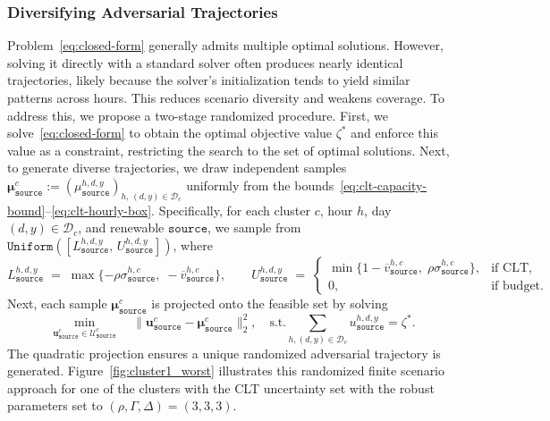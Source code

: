 \documentclass[11pt, letter]{article}
\begin{document}
\subsubsection{Diversifying Adversarial Trajectories}
Problem~\eqref{eq:closed-form} generally admits multiple optimal solutions. However, solving it directly with a standard solver often produces nearly identical trajectories, likely because the solver’s initialization tends to yield similar patterns across hours. This reduces scenario diversity and weakens coverage. To address this, we propose a two-stage randomized procedure. First, we solve~\eqref{eq:closed-form} to obtain the optimal objective value $\zeta^*$ and enforce this value as a constraint, restricting the search to the set of optimal solutions. Next, to generate diverse trajectories, we draw independent samples $\boldsymbol{\mu}^c_\texttt{source} := ({\mu}^{h,d,y}_\texttt{source})_{h,\,(d,y)\in \mathcal{D}_c}$ uniformly from the bounds~\eqref{eq:clt-capacity-bound}--\eqref{eq:clt-hourly-box}. Specifically, for each cluster $c$, hour $h$, day $(d,y) \in \mathcal{D}_c$, and renewable $\texttt{source}$, we sample from $\texttt{Uniform}([L^{h,d,y}_\texttt{source},\, U_\texttt{source}^{h,d,y}])$, where \[
L^{h,d,y}_\texttt{source} \;=\; \max\{-\rho\sigma^{h,c}_\texttt{source},\; -\overline v^{h,c}_\texttt{source}\}, 
\qquad 
U^{h,d,y}_\texttt{source} \;=\;
\begin{cases}
\min\{1-\overline{v}^{h,c}_\texttt{source},\;\rho\sigma^{h,c}_\texttt{source}\}, & \text{if CLT}, \\[6pt]

0, & \text{if budget}.
\end{cases}
\]
Next, each sample $\boldsymbol{\mu}^c_\texttt{source}$ is projected onto the feasible set by solving
\[
\min_{\boldsymbol{u}^c_\texttt{source} \in \mathcal{U}^c_\texttt{source}} \quad \|\boldsymbol{u}^c_\texttt{source} - \boldsymbol{\mu}^c_\texttt{source}\|_2^2, \quad \text{s.t.} \sum_{h,(d,y) \in \mathcal{D}_c}  u_\texttt{source}^{h,d,y} = \zeta^*.\]
The quadratic projection ensures a unique randomized adversarial trajectory is generated. Figure~\ref{fig:cluster1_worst} illustrates this randomized finite scenario approach for one of the clusters with the CLT uncertainty set with the robust parameters set to \( (\rho, \Gamma, \Delta) = (3, 3, 3) \).
\end{document}
